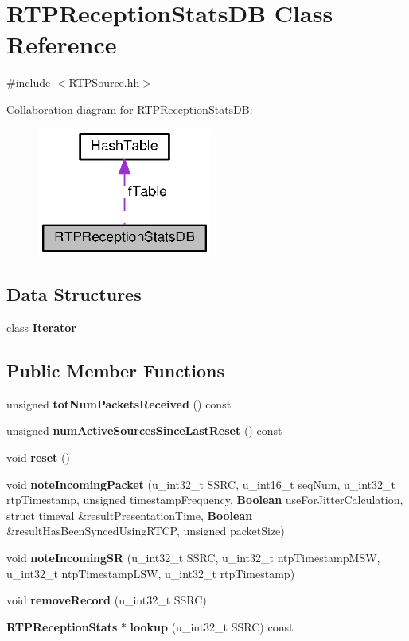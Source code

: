\section{R\+T\+P\+Reception\+Stats\+D\+B Class Reference}
\label{classRTPReceptionStatsDB}


{\ttfamily \#include $<$R\+T\+P\+Source.\+hh$>$}



Collaboration diagram for R\+T\+P\+Reception\+Stats\+D\+B\+:
\nopagebreak
\begin{figure}[H]
\begin{center}
\leavevmode
\includegraphics[width=163pt]{classRTPReceptionStatsDB__coll__graph}
\end{center}
\end{figure}
\subsection*{Data Structures}
\begin{DoxyCompactItemize}
\item 
class {\bf Iterator}
\end{DoxyCompactItemize}
\subsection*{Public Member Functions}
\begin{DoxyCompactItemize}
\item 
unsigned {\bf tot\+Num\+Packets\+Received} () const 
\item 
unsigned {\bf num\+Active\+Sources\+Since\+Last\+Reset} () const 
\item 
void {\bf reset} ()
\item 
void {\bf note\+Incoming\+Packet} (u\+\_\+int32\+\_\+t S\+S\+R\+C, u\+\_\+int16\+\_\+t seq\+Num, u\+\_\+int32\+\_\+t rtp\+Timestamp, unsigned timestamp\+Frequency, {\bf Boolean} use\+For\+Jitter\+Calculation, struct timeval \&result\+Presentation\+Time, {\bf Boolean} \&result\+Has\+Been\+Synced\+Using\+R\+T\+C\+P, unsigned packet\+Size)
\item 
void {\bf note\+Incoming\+S\+R} (u\+\_\+int32\+\_\+t S\+S\+R\+C, u\+\_\+int32\+\_\+t ntp\+Timestamp\+M\+S\+W, u\+\_\+int32\+\_\+t ntp\+Timestamp\+L\+S\+W, u\+\_\+int32\+\_\+t rtp\+Timestamp)
\item 
void {\bf remove\+Record} (u\+\_\+int32\+\_\+t S\+S\+R\+C)
\item 
{\bf R\+T\+P\+Reception\+Stats} $\ast$ {\bf lookup} (u\+\_\+int32\+\_\+t S\+S\+R\+C) const 
\end{DoxyCompactItemize}
